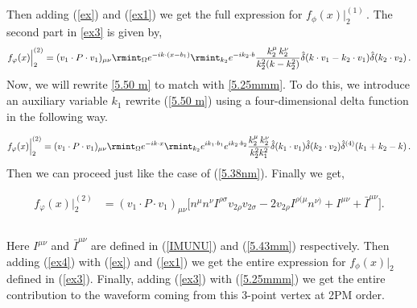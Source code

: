 Then adding (\ref{ex}) and (\ref{ex1}) we get the full expression for $f_{\phi}(x)\Big|_{2}^{(1)}\,.$
The second part in \eqref{ex3} is given by,
\begin{align}
    \begin{split}
    f_{\varphi}(x)\Big|_{2}^{(2)}=(v_1\cdot P\cdot v_1)_{\mu\nu}\rmint_{\Omega}e^{-ik\cdot (x-b_1)}\rmint_{k_2}e^{-ik_2\cdot b}\frac{k_2^\mu\,k_2^\nu}{k_2^2(k-k_2^2)}\hat\delta(k\cdot v_1-k_2\cdot v_1)\hat\delta(k_2\cdot v_2)\,.\label{5.50 m}
    \end{split}
\end{align}
Now, we will rewrite \eqref{5.50 m} to match with \eqref{5.25mmm}. To do this, we introduce an auxiliary variable $k_1$ rewrite (\ref{5.50 m}) using a four-dimensional delta function in the following way.

\begin{align}
\begin{split}f_{\varphi}(x)\Big|_{2}^{(2)}=(v_1\cdot P\cdot v_1)_{\mu\nu}\rmint_{\Omega}e^{-ik\cdot x}\rmint_{k_2}e^{ik_1\cdot b_1}e^{ik_2\cdot b_2}\frac{k_2^\mu\,k_2^\nu}{k_2^2 k_1^2}\hat\delta(k_1\cdot v_1)\hat\delta(k_2\cdot v_2)\hat\delta^{(4)}(k_1+k_2-k)\,.\end{split}
\end{align}
Then we can proceed just like the case of (\ref{5.38nm}). Finally we get,

\begin{equation}\label{ex4}\begin{split}
 f_{\varphi}(x)\Big|_{2}^{(2)}&
      =(v_1\cdot P\cdot v_1)_{\mu\nu}\Big[n^{\mu}n^\nu I^{\rho\sigma}v_{2\rho}v_{2\sigma}-2v_{2\rho}I^{\rho(\mu}n^{\nu)}+I^{\mu\nu}+\bar I^{\mu\nu}\Big].
\\
        \end{split}
\end{equation}\\
Here $I^{\mu\nu}$ and $\bar{I}^{\mu\nu}$ are defined in (\ref{IMUNU}) and (\ref{5.43mm}) respectively. Then  adding (\ref{ex4}) with (\ref{ex}) and (\ref{ex1}) we get the entire expression for $f_{\phi}(x)\Big|_2$ defined in (\ref{ex3}). Finally, adding (\ref{ex3}) with (\ref{5.25mmm}) we get the entire contribution to the waveform coming from this 3-point vertex at 2PM order.

